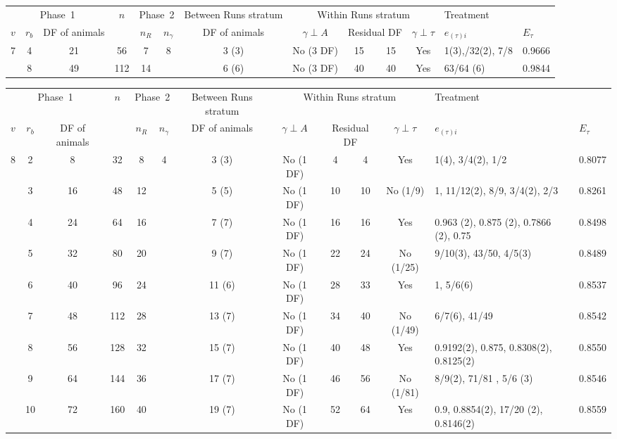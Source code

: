 \documentclass[a4paper,11pt]{article}
\begin{document}
\begin{landscape}
\begin{tabular}[t]{|c|c|c|c|c|c|c|c|c|c|c|p{1in}|p{0.4in}|} \hline
\multicolumn{3}{|c|}{Phase~1}  & $n$  & \multicolumn{2}{c|}{Phase~2} & Between Runs stratum  & \multicolumn{4}{c|}{Within Runs stratum} & \multicolumn{2}{p{1.4in}|}{Treatment} \\ \cline{1-3} \cline{5-6}\cline{7-13}
$v$ & $r_b$ & DF of animals &  & $n_R$ & $n_\gamma$ & DF of animals &  $\gamma \perp A$ & \multicolumn{2}{c|}{Residual DF} & $\gamma \perp \tau$ & $e_{(\tau)i}$ &$E_\tau$\\ \hline
7 & 4 & 21\newline  & 56 & 7 & 8 & 3 (3) & No (3 DF) & 15 & 15 & Yes & 1(3),\newline 31/32(2), 7/8 & 0.9666 \\ \hline 
 & 8 & 49 & 112 & 14 &  & 6 (6) & No (3 DF) & 40 & 40 & Yes & 63/64 (6)\newline  & 0.9844 \\ \hline 
\end{tabular}


\begin{tabular}[t]{|c|c|c|c|c|c|c|c|c|c|c|p{1.1in}|p{0.4in}|} \hline
\multicolumn{3}{|c|}{Phase~1}  & $n$  & \multicolumn{2}{c|}{Phase~2} & Between Runs stratum  & \multicolumn{4}{c|}{Within Runs stratum} & \multicolumn{2}{p{1.4in}|}{Treatment} \\ \cline{1-3} \cline{5-6}\cline{7-13}
$v$ & $r_b$ & DF of animals &  & $n_R$ & $n_\gamma$ & DF of animals &  $\gamma \perp A$ & \multicolumn{2}{c|}{Residual DF} & $\gamma \perp \tau$ & $e_{(\tau)i}$ &$E_\tau$\\ \hline
8 & 2 & 8 & 32 & 8 & 4 & 3 (3) & No (1 DF) & 4 & 4 & Yes & 1(4), 3/4(2), 1/2 & 0.8077 \\ \hline 
 & 3 & 16 & 48 & 12 &  & 5 (5) & No (1 DF) & 10 & 10 & No (1/9) & 1,  11/12(2), 8/9, 3/4(2),  2/3 & 0.8261 \\ \hline 
 & 4 & 24 & 64 & 16 &  & 7 (7) & No (1 DF) & 16 & 16 & Yes & 0.963 (2), 0.875 (2), 0.7866 (2), 0.75 & 0.8498 \\ \hline 
 & 5 & 32 & 80 & 20 &  & 9 (7) & No (1 DF) & 22 & 24 & No (1/25) & 9/10(3), 43/50,  4/5(3) & 0.8489 \\ \hline 
 & 6 & 40 & 96 & 24 &  & 11 (6) & No (1 DF) & 28 & 33 & Yes & 1, 5/6(6) & 0.8537 \\ \hline 
 & 7 & 48 & 112 & 28 &  & 13 (7) & No (1 DF) & 34 & 40 & No (1/49) & 6/7(6), 41/49 & 0.8542 \\ \hline 
 & 8 & 56 & 128 & 32 &  & 15 (7) & No (1 DF) & 40 & 48 & Yes & 0.9192(2), 0.875, 0.8308(2), 0.8125(2)  & 0.8550 \\ \hline 
 & 9 & 64 & 144 & 36 &  & 17 (7) & No (1 DF) & 46 & 56 & No (1/81) & 8/9(2), 71/81 ,   5/6 (3) & 0.8546 \\ \hline 
 & 10 & 72 & 160 & 40 &  & 19 (7) & No (1 DF) & 52 & 64 & Yes & 0.9, 0.8854(2), 17/20 (2), 0.8146(2)  & 0.8559 \\ \hline 
\end{tabular}



\end{landscape}
\end{document}
